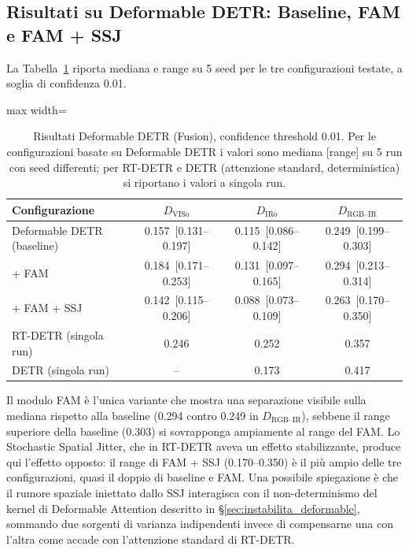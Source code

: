 \documentclass[a4paper,11pt]{article}
\begin{document}
\subsection{Risultati su Deformable DETR: Baseline, FAM e FAM + SSJ}

La Tabella~\ref{tab:def_detr_results} riporta mediana e range su 5 seed per le tre configurazioni testate, a soglia di confidenza 0.01.

\begin{table}[h]
\centering
\caption{Risultati Deformable DETR (Fusion), confidence threshold 0.01. Per le configurazioni basate su Deformable DETR i valori sono mediana [range] su 5 run con seed differenti; per RT-DETR e DETR (attenzione standard, deterministica) si riportano i valori a singola run.}
\label{tab:def_detr_results}
\begin{adjustbox}{max width=\textwidth}
\begin{tabular}{lccc}
\toprule
Configurazione & $D_{\text{VISo}}$ & $D_{\text{IRo}}$ & $D_{\text{RGB--IR}}$ \\
\midrule
Deformable DETR (baseline) & 0.157~[0.131--0.197] & 0.115~[0.086--0.142] & 0.249~[0.199--0.303] \\
\quad + FAM & 0.184~[0.171--0.253] & 0.131~[0.097--0.165] & 0.294~[0.213--0.314] \\
\quad + FAM + SSJ & 0.142~[0.115--0.206] & 0.088~[0.073--0.109] & 0.263~[0.170--0.350] \\
\midrule
RT-DETR (singola run) & 0.246 & 0.252 & 0.357 \\
DETR (singola run) & -- & 0.173 & 0.417 \\
\bottomrule
\end{tabular}
\end{adjustbox}
\end{table}

Il modulo FAM è l'unica variante che mostra una separazione visibile sulla mediana rispetto alla baseline (0.294 contro 0.249 in $D_{\text{RGB--IR}}$), sebbene il range superiore della baseline (0.303) si sovrapponga ampiamente al range del FAM. Lo Stochastic Spatial Jitter, che in RT-DETR aveva un effetto stabilizzante, produce qui l'effetto opposto: il range di FAM + SSJ (0.170--0.350) è il più ampio delle tre configurazioni, quasi il doppio di baseline e FAM. Una possibile spiegazione è che il rumore spaziale iniettato dallo SSJ interagisca con il non-determinismo del kernel di Deformable Attention descritto in \S\ref{sec:instabilita_deformable}, sommando due sorgenti di varianza indipendenti invece di compensarne una con l'altra come accade con l'attenzione standard di RT-DETR.
\end{document}
